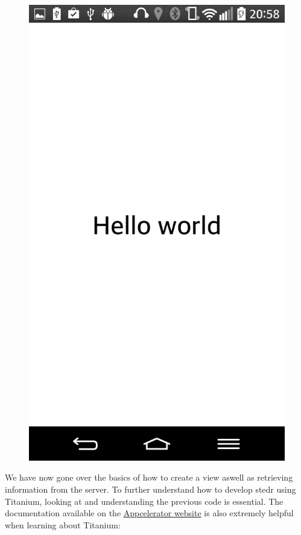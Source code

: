 \begin{figure}
\begin{center}
\includegraphics[scale=0.10]{guide/f11.png} 
\end{center}
\end{figure}


We have now gone over the basics of how to create a view aswell as retrieving information from the server. To further understand how to develop stedr using Titanium, looking at and understanding the previous code is essential. The documentation available on the \href{http://docs.appcelerator.com/titanium/3.0/}{Appcelerator website} is also extremely helpful when learning about Titanium:
